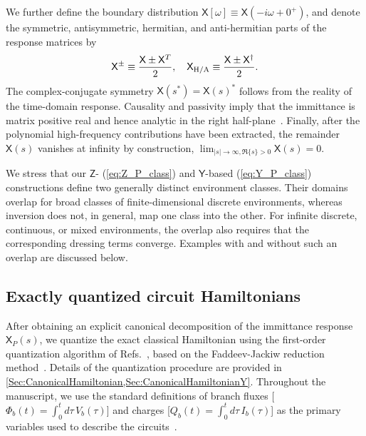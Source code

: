 \documentclass[prx,aps,twocolumn,article]{revtex4-2}
\newcommand{\msf}[1]{\mathsf{#1}}
\newcommand{\msY}{\msf{Y}}
\newcommand{\msZ}{\msf{Z}}
\newcommand{\msX}{\msf{X}}
\begin{document}
We further define the boundary distribution $\msX[\omega]\equiv \msX(-i\omega+0^+)$, and denote the symmetric, antisymmetric, hermitian, and anti-hermitian parts of the response matrices by
\begin{align}
    \msX^\pm\equiv\frac{\msX\pm \msX^T}{2}, \quad  \msX_{\rm H/A}\equiv \frac{\msX\pm \msX^\dag}{2}.
\label{Eq:HermitianAntiHermitian}
\end{align}
The complex-conjugate symmetry $\msX(s^*)=\msX(s)^*$ follows from the reality of the time-domain response. Causality and passivity imply that the immittance is matrix positive real and hence analytic in the right half-plane~\cite{Newcomb:1966}. Finally, after the polynomial high-frequency contributions have been extracted, the remainder $\msX(s)$ vanishes at infinity by construction, $\lim_{{|s|\rightarrow\infty,\Re\{s\}>0}} \msX(s)=0$. 

We stress that our $\msZ$- (\ref{eq:Z_P_class}) and $\msY$-based
(\ref{eq:Y_P_class}) constructions define two generally distinct environment classes. Their domains overlap for broad classes of finite-dimensional discrete environments, whereas inversion does not, in general, map one class into the other. For infinite discrete, continuous, or mixed environments, the overlap also requires that the corresponding dressing terms converge. Examples with and without such an overlap are discussed below.


\subsection{Exactly quantized circuit Hamiltonians}
\label{Sec:DiscreteQuantizedHamiltonian}

After obtaining an explicit canonical decomposition of the immittance response $\msX_P(s)$, we quantize the exact classical Hamiltonian using the first-order quantization algorithm of Refs.~\cite{ParraRodriguez:2024,ParraRodriguez:2025}, based on the Faddeev-Jackiw reduction method~\cite{Faddeev:1988,Jackiw:1993}. Details of the quantization procedure are provided in \cref{Sec:CanonicalHamiltonian,Sec:CanonicalHamiltonianY}. Throughout the manuscript, we use the standard definitions of branch fluxes [$\Phi_b(t)=\int_0^t d\tau\, V_b(\tau)$] and charges [$Q_b(t)=\int_0^t d\tau\, I_b(\tau)$] as the primary variables used to describe the circuits~\cite{Devoret:1997}.
\end{document}
